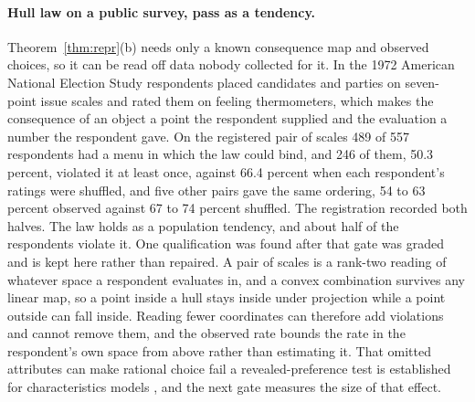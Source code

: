 \documentclass{article}
\theoremstyle{definition}
\theoremstyle{remark}
\begin{document}
\paragraph{Hull law on a public survey, pass as a tendency.}
Theorem~\ref{thm:repr}(b) needs only a known consequence map and observed choices, so it can be read off data nobody collected for it.
In the 1972 American National Election Study respondents placed candidates and parties on seven-point issue scales and rated them on feeling thermometers, which makes the consequence of an object a point the respondent supplied and the evaluation a number the respondent gave.
On the registered pair of scales 489 of 557 respondents had a menu in which the law could bind, and 246 of them, 50.3 percent, violated it at least once, against 66.4 percent when each respondent's ratings were shuffled, and five other pairs gave the same ordering, 54 to 63 percent observed against 67 to 74 percent shuffled.
The registration recorded both halves. The law holds as a population tendency, and about half of the respondents violate it.
One qualification was found after that gate was graded and is kept here rather than repaired.
A pair of scales is a rank-two reading of whatever space a respondent evaluates in, and a convex combination survives any linear map, so a point inside a hull stays inside under projection while a point outside can fall inside.
Reading fewer coordinates can therefore add violations and cannot remove them, and the observed rate bounds the rate in the respondent's own space from above rather than estimating it.
That omitted attributes can make rational choice fail a revealed-preference test is established for characteristics models \citep{blow2008revealed}, and the next gate measures the size of that effect.
\end{document}
